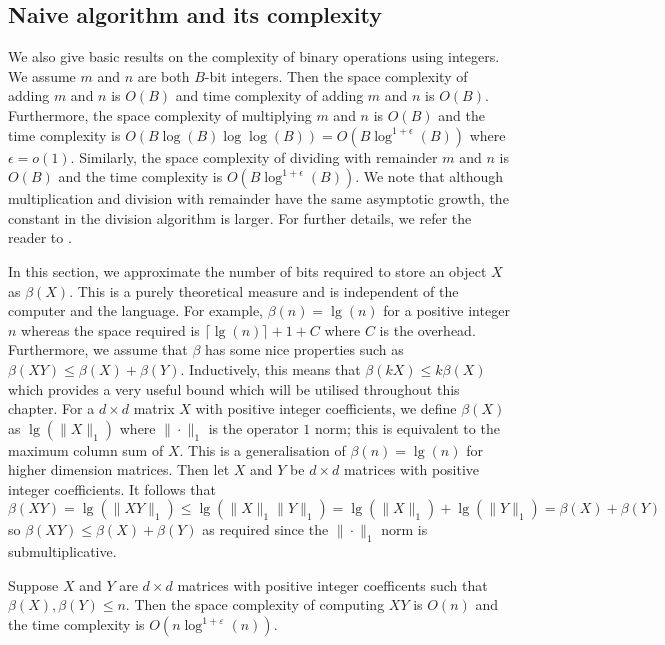       
\subsection{Naive algorithm and its complexity}

We also give basic results on the complexity of binary operations using integers. We assume $m$ and $n$ are both $B$-bit integers. Then the space complexity of adding $m$ and $n$ is $O(B)$ and time complexity of adding $m$ and $n$ is $O(B)$. Furthermore, the space complexity  of multiplying $m$ and $n$ is $O(B)$ and the time complexity is $O(B\log(B)\log\log(B))=O(B\log^{1+\epsilon}(B))$ where $\epsilon=o(1)$. Similarly, the space complexity  of dividing with remainder $m$ and $n$ is $O(B)$ and the time complexity is $O(B\log^{1+\epsilon}(B))$. We note that although multiplication and division with remainder have the same asymptotic growth, the constant in the division algorithm is larger. For further details, we refer the reader to \cite[Ch.8,9]{vzGG99}.

In this section, we approximate the number of bits required to store an object $X$ as $\beta(X)$.   This is a purely theoretical measure and is independent of the computer and the language. For example, $\beta(n)=\lg(n)$ for a positive integer $n$ whereas the space required is $\lceil \lg(n)\rceil+1+C$ where $C$ is the overhead. Furthermore, we assume that $\beta$ has some nice properties such as $\beta(XY)\leq \beta(X)+\beta(Y)$. Inductively, this means that $\beta(kX)\leq k \beta(X)$ which provides a very useful bound which will be utilised throughout this chapter.
For a $d\times d$ matrix $X$ with positive integer coefficients, we define $\beta(X)$ as $\lg(\|X\|_{1})$ where $\|\cdot \|_{1}$ is the operator $1$ norm; this is equivalent to the maximum column sum of $X$. This is a generalisation of $\beta(n)=\lg(n)$ for higher dimension matrices. Then let $X$ and $Y$ be $d\times d$ matrices with positive integer coefficients. It follows that 
$\beta(XY)=\lg(\|XY\|_{1})\leq \lg(\|X\|_{1}\|Y\|_{1})=\lg(\|X\|_{1})+\lg(\|Y\|_{1})=\beta(X)+\beta(Y)$ so $\beta(XY)\leq\beta(X)+\beta(Y)$ as required since the $\|\cdot \|_{1}$ norm is submultiplicative.     

\begin{theorem} Suppose $X$ and $Y$ are $d \times d$ matrices with positive integer coefficents such that $\beta(X),\beta(Y)\leq n$. Then the space  complexity of computing $XY$ is $O(n)$ and the time complexity is $O(n\log^{1+\varepsilon}(n))$.
\end{theorem} 

